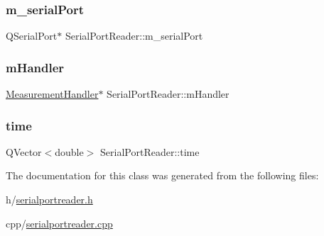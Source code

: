 \mbox{\label{class_serial_port_reader_a07a8c1715274118e7886f671f287c3ec}} 
\subsubsection{\texorpdfstring{m\+\_\+serial\+Port}{m\_serialPort}}
{\footnotesize\ttfamily Q\+Serial\+Port$\ast$ Serial\+Port\+Reader\+::m\+\_\+serial\+Port\hspace{0.3cm}{\ttfamily [private]}}

\mbox{\label{class_serial_port_reader_a2ee8eead177a8d309115708a4ca354d0}} 
\subsubsection{\texorpdfstring{m\+Handler}{mHandler}}
{\footnotesize\ttfamily \mbox{\hyperlink{class_measurement_handler}{Measurement\+Handler}}$\ast$ Serial\+Port\+Reader\+::m\+Handler\hspace{0.3cm}{\ttfamily [private]}}

\mbox{\label{class_serial_port_reader_ac023d7fa3c67e9e9d3d20e73249312c5}} 
\subsubsection{\texorpdfstring{time}{time}}
{\footnotesize\ttfamily Q\+Vector$<$double$>$ Serial\+Port\+Reader\+::time\hspace{0.3cm}{\ttfamily [private]}}



The documentation for this class was generated from the following files\+:\begin{DoxyCompactItemize}
\item 
h/\mbox{\hyperlink{serialportreader_8h}{serialportreader.\+h}}\item 
cpp/\mbox{\hyperlink{serialportreader_8cpp}{serialportreader.\+cpp}}\end{DoxyCompactItemize}
